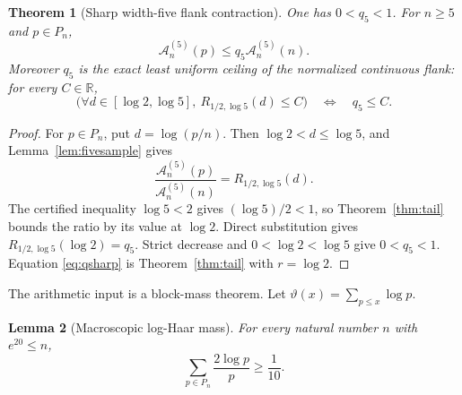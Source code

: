\documentclass[11pt]{article}
\newtheorem{theorem}{Theorem}[section]
\newtheorem{lemma}[theorem]{Lemma}
\newcommand{\R}{\mathbb R}
\newcommand{\A}{\mathcal A}
\begin{document}
\begin{theorem}[Sharp width-five flank contraction]\label{thm:fivecontraction}
One has $0<q_5<1$.  For $n\ge5$ and $p\in P_n$,
\begin{equation}\label{eq:fivecontract}
 \A_n^{(5)}(p)\le q_5\A_n^{(5)}(n).
\end{equation}
Moreover $q_5$ is the exact least uniform ceiling of the normalized continuous flank:
for every $C\in\R$,
\begin{equation}\label{eq:qsharp}
 \bigl(\forall d\in[\log2,\log5],\
 R_{1/2,\log5}(d)\le C\bigr)
 \quad\Longleftrightarrow\quad q_5\le C.
\end{equation}
\end{theorem}

\begin{proof}
For $p\in P_n$, put $d=\log(p/n)$.  Then $\log2<d\le\log5$, and
Lemma~\ref{lem:fivesample} gives
\[
 \frac{\A_n^{(5)}(p)}{\A_n^{(5)}(n)}
 =R_{1/2,\log5}(d).
\]
The certified inequality $\log5<2$ gives $(\log5)/2<1$, so
Theorem~\ref{thm:tail} bounds the ratio by its value at $\log2$.  Direct substitution gives
$R_{1/2,\log5}(\log2)=q_5$.  Strict decrease and
$0<\log2<\log5$ give $0<q_5<1$.  Equation \eqref{eq:qsharp} is
Theorem~\ref{thm:tail} with $r=\log2$.
\end{proof}

The arithmetic input is a block-mass theorem.  Let
$\vartheta(x)=\sum_{p\le x}\log p$.

\begin{lemma}[Macroscopic log-Haar mass]\label{lem:massfloor}
For every natural number $n$ with $e^{20}\le n$,
\begin{equation}\label{eq:massfloorfive}
 \sum_{p\in P_n}\frac{2\log p}{p}\ge\frac1{10}.
\end{equation}
\end{lemma}
\end{document}
